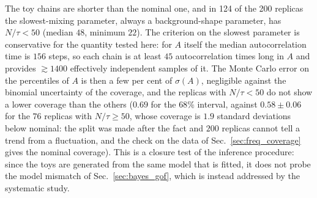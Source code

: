 The toy chains are shorter than the nominal one, and in 124 of the 200 replicas the slowest-mixing parameter, always a background-shape parameter, has $N/\tau<50$ (median $48$, minimum $22$). The criterion on the slowest parameter is conservative for the quantity tested here: for $A$ itself the median autocorrelation time is $156$ steps, so each chain is at least $45$ autocorrelation times long in $A$ and provides $\gtrsim1400$ effectively independent samples of it. The Monte Carlo error on the percentiles of $A$ is then a few per cent of $\sigma(A)$, negligible against the binomial uncertainty of the coverage, and the replicas with $N/\tau<50$ do not show a lower coverage than the others ($0.69$ for the $68\%$ interval, against $0.58\pm0.06$ for the $76$ replicas with $N/\tau\geq50$, whose coverage is $1.9$ standard deviations below nominal: the split was made after the fact and $200$ replicas cannot tell a trend from a fluctuation, and the check on the data of Sec.~\ref{sec:freq_coverage} gives the nominal coverage). This is a closure test of the inference procedure: since the toys are generated from the same model that is fitted, it does not probe the model mismatch of Sec.~\ref{sec:bayes_gof}, which is instead addressed by the systematic study.


